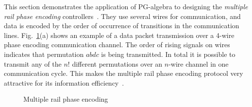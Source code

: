 This section demonstrates the application of PG-algebra to designing
the \emph{multiple rail phase encoding} controllers\emph{~}\cite{2006_cdalessandro_async}.
They use several wires for communication, and data is encoded by the
order of occurrence of transitions in the communication lines. Fig.~\ref{fig:phase-encoding}(a)
shows an example of a data packet transmission over a 4-wire phase
encoding communication channel. The order of rising signals on wires
indicates that permutation $abdc$ is being transmitted. In total
it is possible to transmit any of the $n!$ different permutations
over an $n$-wire channel in one communication cycle. This makes the
multiple rail phase encoding protocol very attractive for its information
efficiency~\cite{2010_mokhov_ieee}. 

\begin{figure}[t]
\begin{centering}
\hfill{}\hfill{}\hfill{}
\par\end{centering}

\caption{Multiple rail phase encoding\label{fig:phase-encoding}}
\vspace{-6mm}
\end{figure}


